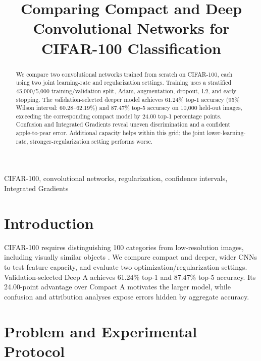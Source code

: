 \documentclass[conference]{IEEEtran}
\begin{document}
\title{Comparing Compact and Deep Convolutional Networks for CIFAR-100 Classification}
\author{}
\maketitle
\begin{abstract}
We compare two convolutional networks trained from scratch on CIFAR-100, each using two joint learning-rate and regularization settings. Training uses a stratified 45,000/5,000 training/validation split, Adam, augmentation, dropout, L2, and early stopping. The validation-selected deeper model achieves 61.24\% top-1 accuracy (95\% Wilson interval: 60.28--62.19\%) and 87.47\% top-5 accuracy on 10,000 held-out images, exceeding the corresponding compact model by 24.00 top-1 percentage points. Confusion and Integrated Gradients reveal uneven discrimination and a confident apple-to-pear error. Additional capacity helps within this grid; the joint lower-learning-rate, stronger-regularization setting performs worse.

\end{abstract}
\begin{IEEEkeywords}
CIFAR-100, convolutional networks, regularization, confidence intervals, Integrated Gradients
\end{IEEEkeywords}

\section{Introduction}
CIFAR-100 requires distinguishing 100 categories from low-resolution images, including visually similar objects \cite{cifar}. We compare compact and deeper, wider CNNs to test feature capacity, and evaluate two optimization/regularization settings. Validation-selected Deep A achieves 61.24\% top-1 and 87.47\% top-5 accuracy. Its 24.00-point advantage over Compact A motivates the larger model, while confusion and attribution analyses expose errors hidden by aggregate accuracy.

\section{Problem and Experimental Protocol}
\end{document}
